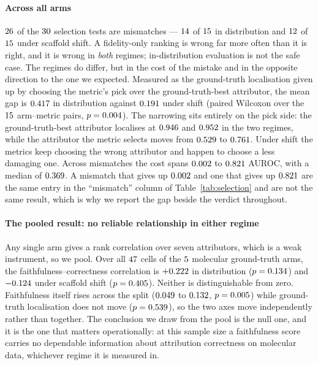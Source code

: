 \paragraph{Across all \nArms{} arms} $26{}$ of the
$30{}$ selection tests are mismatches ---
$14{}$ of $15{}$ in distribution and
$12{}$ of $15{}$ under scaffold shift. A
fidelity-only ranking is wrong far more often than it is right, and it is
wrong in \emph{both} regimes; in-distribution evaluation is not the safe case.
\ifHasSelGapTest
The regimes do differ, but in the cost of the mistake and in the opposite
direction to the one we expected. Measured as the ground-truth localisation
given up by choosing the metric's pick over the ground-truth-best attributor,
the mean gap is $0.417{}$ in distribution against
$0.191{}$ under shift (paired Wilcoxon over the
$15{}$ arm--metric pairs, $p=0.004{}$). The narrowing sits
entirely on the pick side: the ground-truth-best attributor localises at
$0.946{}$ and $0.952{}$ in the two regimes, while the
attributor the metric selects moves from $0.529{}$ to
$0.761{}$. Under shift the metrics keep choosing the wrong
attributor and happen to choose a less damaging one.
\fi
Across mismatches the cost spans $0.002{}$ to $0.821{}$ AUROC, with
a median of $0.369{}$. A mismatch that gives up $0.002{}$ and one
that gives up $0.821{}$ are the same entry in the ``mismatch'' column of
Table~\ref{tab:selection} and are not the same result, which is why we report
the gap beside the verdict throughout.

\paragraph{The pooled result: no reliable relationship in either regime} Any
single arm gives a rank correlation over seven attributors, which is a weak
instrument, so we pool. Over all $47{}$ cells of the
$5{}$ molecular ground-truth arms, the faithfulness--correctness
correlation is $+0.222{}$ in distribution ($p=0.134{}$) and
$-0.124{}$ under scaffold shift ($p=0.405{}$). Neither is
distinguishable from zero. Faithfulness itself rises across the split
($0.049{}$ to $0.132{}$,
$p=0.005{}$) while ground-truth localisation does not move
($p=0.539{}$), so the two axes move independently rather than
together. The conclusion we draw from the pool is the null one, and it is the
one that matters operationally: at this sample size a faithfulness score
carries no dependable information about attribution correctness on molecular
data, whichever regime it is measured in.

